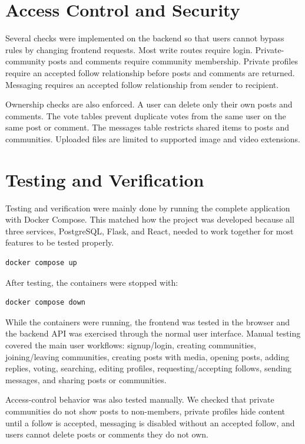 \documentclass[11pt]{article}
\begin{document}
\section{Access Control and Security}

Several checks were implemented on the backend so that users cannot bypass rules by changing frontend requests. Most write routes require login. Private-community posts and comments require community membership. Private profiles require an accepted follow relationship before posts and comments are returned. Messaging requires an accepted follow relationship from sender to recipient.

Ownership checks are also enforced. A user can delete only their own posts and comments. The vote tables prevent duplicate votes from the same user on the same post or comment. The messages table restricts shared items to posts and communities. Uploaded files are limited to supported image and video extensions.

\section{Testing and Verification}

Testing and verification were mainly done by running the complete application with Docker Compose. This matched how the project was developed because all three services, PostgreSQL, Flask, and React, needed to work together for most features to be tested properly.

\begin{verbatim}
docker compose up
\end{verbatim}

After testing, the containers were stopped with:

\begin{verbatim}
docker compose down
\end{verbatim}

While the containers were running, the frontend was tested in the browser and the backend API was exercised through the normal user interface. Manual testing covered the main user workflows: signup/login, creating communities, joining/leaving communities, creating posts with media, opening posts, adding replies, voting, searching, editing profiles, requesting/accepting follows, sending messages, and sharing posts or communities.

Access-control behavior was also tested manually. We checked that private communities do not show posts to non-members, private profiles hide content until a follow is accepted, messaging is disabled without an accepted follow, and users cannot delete posts or comments they do not own.
\end{document}
